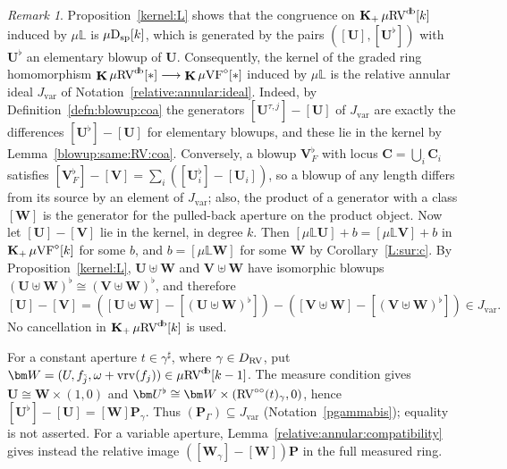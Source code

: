 \documentclass[12pt]{amsart}
\theoremstyle{plain}
\theoremstyle{definition}
\theoremstyle{remark}
\newtheorem{rem}[thm]{Remark}
\numberwithin{equation}{section}
\theoremstyle{plain}
\newcommand{\VF}{\textup{VF}}
\newcommand{\RV}{\textup{RV}}
\newcommand{\0}{\emptyset}
\newcommand{\bb}[1]{\mathbb{#1}}
\newcommand{\fun}{\longrightarrow}
\newcommand{\sub}{\subseteq}
\newcommand{\mVF}{{\mu}{\VF}}
\newcommand{\mRV}{{\mu}{\RV}}
\newcommand{\dsp}{\textup{D}_{\textup{sp}}}
\newcommand{\mispdb}{\mu \dsp}
\newcommand{\mL}{{\mu}{\bb L}}
\DeclareMathOperator{\gsk}{\mathbf{K}_+}
\DeclareMathOperator{\ggk}{\mathbf{K}}
\DeclareMathOperator{\vrv}{vrv}
\DeclareMathOperator{\db}{d \! b}
\newcommand{\ccirc}{\circ \circ}
\begin{document}
\begin{rem}\label{thekernel}
Proposition~\ref{kernel:L} shows that the congruence on $\gsk \mRV^{\db}[k]$ induced by $\mL$ is $\mispdb[k]$, which is generated by the pairs $([\bm U], [\bm U^\flat])$ with $\bm U^\flat$ an elementary blowup of $\bm U$. Consequently, the kernel of the graded ring homomorphism $\ggk \mRV^{\db}[*] \fun \ggk \mVF^\diamond[*]$ induced by $\mL$ is the relative annular ideal $J_{\mathrm{var}}$ of Notation~\ref{relative:annular:ideal}. Indeed, by Definition~\ref{defn:blowup:coa} the generators $[\bm U^{\tau, j}] - [\bm U]$ of $J_{\mathrm{var}}$ are exactly the differences $[\bm U^\flat] - [\bm U]$ for elementary blowups, and these lie in the kernel by Lemma~\ref{blowup:same:RV:coa}. Conversely, a blowup $\bm V^\flat_F$ with locus $\bm C = \bigcup_i \bm C_i$ satisfies $[\bm V^\flat_F] - [\bm V] = \sum_i ([\bm U_i^\flat] - [\bm U_i])$, so a blowup of any length differs from its source by an element of $J_{\mathrm{var}}$; also, the product of a generator with a class $[\bm W]$ is the generator for the pulled-back aperture on the product object. Now let $[\bm U] - [\bm V]$ lie in the kernel, in degree $k$. Then $[\mL \bm U] + b = [\mL \bm V] + b$ in $\gsk \mVF^\diamond[k]$ for some $b$, and $b = [\mL \bm W]$ for some $\bm W$ by Corollary~\ref{L:sur:c}. By Proposition~\ref{kernel:L}, $\bm U \uplus \bm W$ and $\bm V \uplus \bm W$ have isomorphic blowups $(\bm U \uplus \bm W)^\flat \cong (\bm V \uplus \bm W)^\flat$, and therefore
\[
[\bm U] - [\bm V] = ([\bm U \uplus \bm W] - [(\bm U \uplus \bm W)^\flat]) - ([\bm V \uplus \bm W] - [(\bm V \uplus \bm W)^\flat]) \in J_{\mathrm{var}}.
\]
No cancellation in $\gsk \mRV^{\db}[k]$ is used.

For a constant aperture $t \in \gamma^\sharp$, where $\gamma \in D_{\RV}$, put $\bm W = (U, f_{\tilde j}, \omega + \vrv(f_j)) \in \mRV^{\db}[k-1]$. The measure condition gives $\bm U \cong \bm W \times (1, 0)$ and $\bm U^\flat \cong \bm W \times (\RV^{\ccirc}(t)_\gamma, 0)$, hence $[\bm U^\flat] - [\bm U] = [\bm W] \bm P_\gamma$. Thus $(\bm P_\Gamma) \sub J_{\mathrm{var}}$ (Notation~\ref{pgammabis}); equality is not asserted. For a variable aperture, Lemma~\ref{relative:annular:compatibility} gives instead the relative image $([\bm W_\gamma] - [\bm W]) \bm P$ in the full measured ring.


\end{rem}
\end{document}
